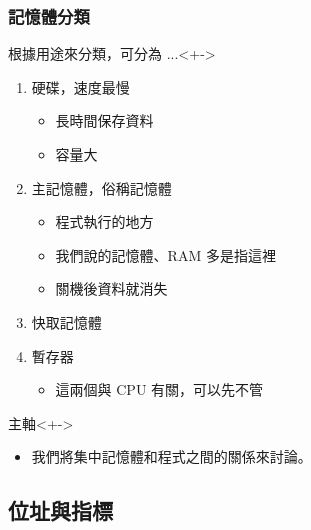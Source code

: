 \documentclass[utf8]{beamer}
\begin{document}
\begin{CJK}{UTF8}{bkai}
\begin{frame}
  \frametitle{記憶體分類}
  \begin{block}{根據用途來分類，可分為 ...}<+->
    \begin{enumerate}[<+->]
    \item 硬碟，速度最慢
      \begin{itemize}[<+->]
      \item 長時間保存資料
      \item 容量大
      \end{itemize}
    \item \alert{主記憶體}，俗稱記憶體
      \begin{itemize}[<+->]
      \item \alert{程式執行的地方}
      \item 我們說的記憶體、RAM 多是指這裡
      \item 關機後資料就消失
      \end{itemize}
    \item 快取記憶體
    \item 暫存器
      \begin{itemize}[<+->]
      \item 這兩個與 CPU 有關，可以先不管
      \end{itemize}
    \end{enumerate}
  \end{block}
  \begin{exampleblock}{主軸}<+->
    \begin{itemize}
    \item 我們將集中記憶體和程式之間的關係來討論。
    \end{itemize}
  \end{exampleblock}
\end{frame}

\subsection{位址與指標}


\end{CJK}
\end{document}
